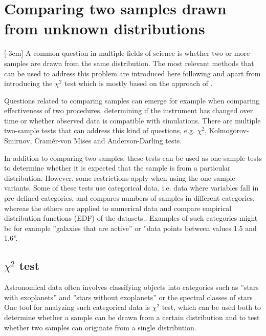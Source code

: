 \documentclass[english, oneside]{HYgradu}
\begin{document}


\section{Comparing two samples drawn from unknown distributions}
\reversemarginpar
{}[-3cm]
A common question in multiple fields of science is whether two or more samples are drawn from the same distribution. The most relevant methods that can be used to address this problem are introduced here following \citep{bohm2010introduction} and \citep{feigelson2012modern} apart from introducing the $\chi^2$ test which is mostly based on the approach of \citep{corder2014nonparametric}.

Questions related to comparing samples can emerge for example when comparing effectiveness of two procedures, determining if the instrument has changed over time or whether observed data is compatible with simulations. There are multiple two-sample tests that can address this kind of questions, e.g. $\chi^2$, Kolmogorov-Smirnov, Cram\'er-von Mises and Anderson-Darling tests. 

In addition to comparing two samples, these tests can be used as one-sample tests to determine whether it is expected that the sample is from a particular distribution. However, some restrictions apply when using the one-sample variants. Some of these tests use categorical data, i.e. data where variables fall in pre-defined categories, and compares numbers of samples in different categories, whereas the others are applied to numerical data and compare empirical distribution functions (EDF) of the datasets.. Examples of such categories might be for example ''galaxies that are active'' or ''data points between values 1.5 and 1.6''.


\subsection{$\chi^2$ test}
\reversemarginpar
{}
Astronomical data often involves classifying objects into categories such as ''stars with exoplanets'' and ''stars without exoplanets'' or the spectral classes of stars  \citep{feigelson2012modern}. One tool for analyzing such categorical data is $\chi^2$ test, which can be used both to determine whether a sample can be drawn from a certain distribution and to test whether two samples can originate from a single distribution. 
\end{document}
